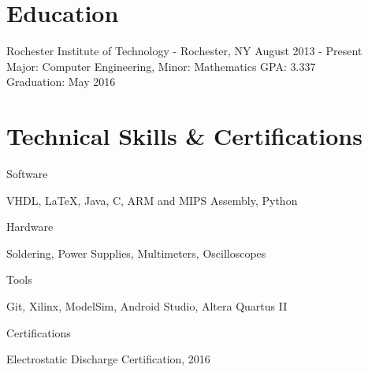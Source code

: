 \documentclass[a4paper,margin,line]{resume}
\newcommand{\rdate}[1]{\hfill {\small #1}}
\begin{document}
\begin{resume}
\section{\mysidestyle Education}
	\begin{compactdesc}
		\item[Rochester Institute of Technology] - Rochester, NY \rdate{August 2013 - Present} \\
            Major: Computer Engineering, Minor: Mathematics \rdate{GPA: 3.337} \\
            Graduation: May 2016
	\end{compactdesc}

\section{\mysidestyle Technical Skills \& Certifications}
    \begin{compactdesc}
		\item[Software] \begin{inparaenum} { \small
            VHDL,
            \LaTeX,
			Java,
			C,
            ARM and MIPS Assembly,
            Python
		} \end{inparaenum}
		\item[Hardware] \begin{inparaenum} { \small
			Soldering,
            Power Supplies,
            Multimeters,
            Oscilloscopes
		} \end{inparaenum}
        \item[Tools] \begin{inparaenum} { \small
            Git,
            Xilinx,
            ModelSim,
            Android Studio,
            Altera Quartus II
        } \end{inparaenum}
        \item[Certifications] \begin{inparaenum} { \small
            Electrostatic Discharge Certification, 2016   
        } \end{inparaenum}
	\end{compactdesc}


\end{resume}
\end{document}
